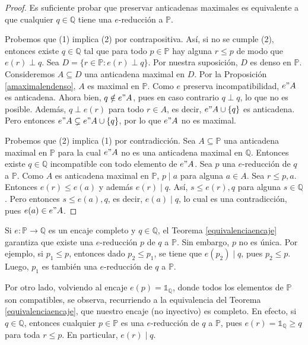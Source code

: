 \documentclass[11pt]{unam_tesis1}
\theoremstyle{MyThmStyle}
\theoremstyle{definition}
\theoremstyle{plain}
\theoremstyle{remark}
\let\leq\leqslant
\let\geq\geqslant
\begin{document}
\begin{proof}
Es suficiente probar que preservar anticadenas maximales es equivalente a que cualquier $q\in \mathbb Q $ tiene una $e$-reducci\'on a $\mathbb P$.

Probemos que (1) implica (2) por contrapositiva. As\'i, si no se cumple (2), entonces existe $q\in \mathbb Q$ tal que para todo $p\in \mathbb P$ hay alguna $r\leq p$ de modo que $e(r)\perp q$. Sea $D=\{r\in \mathbb P:e(r)\perp q \}$. Por nuestra suposici\'on, $D$ es denso en $\mathbb P$. Consideremos $A\subseteq D$ una anticadena maximal en $D$. Por la Proposici\'on \ref{amaximalendenso}, $A$ es maximal en $\mathbb P$. Como $e$ preserva incompatibilidad, $e"A$ es anticadena. Ahora bien, $q\notin e"A$, pues en caso contrario $q\perp q$, lo que no es posible. Adem\'as, $q\perp e(r)$ para todo $r\in A$, es decir,  $e"A\cup \{q\}$ es anticadena. Pero entonces $e"A \subsetneq e"A\cup \{q\}$, por lo que $e"A$ no es maximal.

Probemos que (2) implica (1) por contradicci\'on. Sea $A\subseteq  \mathbb P$ una anticadena maximal en $\mathbb P$ para la cual $e"A$ no es una anticadena maximal en $\mathbb Q$. Entonces existe $q\in \mathbb Q$ incompatible con todo elemento de $e"A$. Sea $p$ una $e$-reducci\'on de $q$ a $\mathbb P$. Como $A$ es anticadena maximal en $\mathbb P$, $p\mid a$ para alguna $a\in A$. Sea $r\leq p,a$. Entonces $e(r)\leq e(a)$ y adem\'as $e(r)\mid q$. As\'i, $s\leq e(r),q$ para alguna $s\in \mathbb Q$. Pero entonces $s\leq e(a), q$, es decir, $e(a)\mid q$, lo cual es una contradicci\'on, pues $e(a)\in e"A$.
\end{proof}


Si $e:\mathbb P\to \mathbb Q$ es un encaje completo y $q\in \mathbb Q$, el Teorema \ref{equivalenciaencaje} garantiza que existe una $e$-reducci\'on $p$ de $q$ a $\mathbb P$. Sin embargo, $p$ no es \'unica. Por ejemplo, si $p_1\leq p$, entonces dado $p_2\leq p_1$, se tiene que $e(p_2)\mid q$, pues $p_2\leq p$. Luego, $p_1$ es tambi\'en una $e$-reducci\'on de $q$ a $\mathbb P$.

Por otro lado, volviendo al encaje $e(p)=\mathds 1_{\mathbb Q}$, donde todos los elementos de $\mathbb P$ son compatibles, se observa, recurriendo a la equivalencia del Teorema \ref{equivalenciaencaje}, que nuestro encaje (no inyectivo) es completo. En efecto, si $q\in \mathbb Q$, entonces cualquier $p\in \mathbb P$ es una $e$-reducci\'on de $q$ a $\mathbb P$, pues $e(r)=\mathds 1_{\mathbb Q}\geq q$ para toda $r\leq p$. En particular, $e(r)\mid q$.
\end{document}
